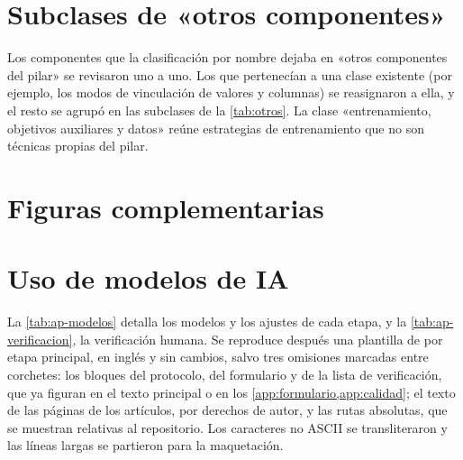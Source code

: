 \section{Subclases de «otros componentes»}\label{app:otros}
Los componentes que la clasificación por nombre dejaba en «otros componentes del pilar» se revisaron uno a uno. Los que pertenecían a una clase existente (por ejemplo, los modos de vinculación de valores y columnas) se reasignaron a ella, y el resto se agrupó en las subclases de la \cref{tab:otros}. La clase «entrenamiento, objetivos auxiliares y datos» reúne estrategias de entrenamiento que no son técnicas propias del pilar.


\section{Figuras complementarias}\label{app:figuras}


\section{Uso de modelos de IA}\label{app:ia}
La \cref{tab:ap-modelos} detalla los modelos y los ajustes de cada etapa, y la \cref{tab:ap-verificacion}, la
verificación humana. Se reproduce después una plantilla de  por etapa principal, en inglés y sin cambios,
salvo tres omisiones marcadas entre corchetes: los bloques del protocolo, del formulario y de la lista de verificación,
que ya figuran en el texto principal o en los \cref{app:formulario,app:calidad}; el texto de las páginas de los
artículos, por derechos de autor, y las rutas absolutas, que se muestran relativas al repositorio. Los caracteres no
ASCII se transliteraron y las líneas largas se partieron para la maquetación.


